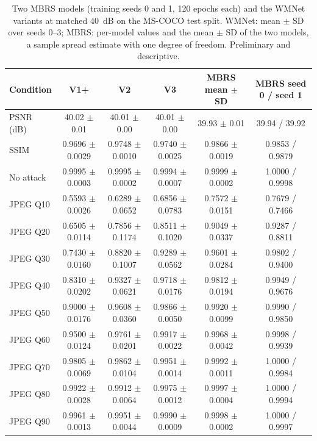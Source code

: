 \begin{table}[ht]
\centering
\caption{Two MBRS models (training seeds 0 and 1, 120 epochs each) and the WMNet variants at matched 40~dB on the MS-COCO test split. WMNet: mean $\pm$ SD over seeds 0--3; MBRS: per-model values and the mean $\pm$ SD of the two models, a sample spread estimate with one degree of freedom. Preliminary and descriptive.}
\label{tab:mbrs2}
\small
\begin{tabular}{lccccc}
\toprule
Condition & V1+ & V2 & V3 & MBRS mean $\pm$ SD & MBRS seed 0 / seed 1 \\
\midrule
PSNR (dB) & 40.02 $\pm$ 0.01 & 40.01 $\pm$ 0.00 & 40.01 $\pm$ 0.00 & 39.93 $\pm$ 0.01 & 39.94 / 39.92 \\
SSIM & 0.9696 $\pm$ 0.0029 & 0.9748 $\pm$ 0.0010 & 0.9740 $\pm$ 0.0025 & 0.9866 $\pm$ 0.0019 & 0.9853 / 0.9879 \\
No attack & 0.9995 $\pm$ 0.0003 & 0.9995 $\pm$ 0.0002 & 0.9994 $\pm$ 0.0007 & 0.9999 $\pm$ 0.0002 & 1.0000 / 0.9998 \\
JPEG Q10 & 0.5593 $\pm$ 0.0026 & 0.6289 $\pm$ 0.0652 & 0.6856 $\pm$ 0.0783 & 0.7572 $\pm$ 0.0151 & 0.7679 / 0.7466 \\
JPEG Q20 & 0.6505 $\pm$ 0.0114 & 0.7856 $\pm$ 0.1174 & 0.8511 $\pm$ 0.1020 & 0.9049 $\pm$ 0.0337 & 0.9287 / 0.8811 \\
JPEG Q30 & 0.7430 $\pm$ 0.0160 & 0.8820 $\pm$ 0.1007 & 0.9289 $\pm$ 0.0562 & 0.9601 $\pm$ 0.0284 & 0.9802 / 0.9400 \\
JPEG Q40 & 0.8310 $\pm$ 0.0202 & 0.9327 $\pm$ 0.0621 & 0.9718 $\pm$ 0.0176 & 0.9812 $\pm$ 0.0194 & 0.9949 / 0.9676 \\
JPEG Q50 & 0.9000 $\pm$ 0.0176 & 0.9608 $\pm$ 0.0360 & 0.9866 $\pm$ 0.0050 & 0.9920 $\pm$ 0.0099 & 0.9990 / 0.9850 \\
JPEG Q60 & 0.9500 $\pm$ 0.0124 & 0.9761 $\pm$ 0.0201 & 0.9917 $\pm$ 0.0022 & 0.9968 $\pm$ 0.0042 & 0.9998 / 0.9939 \\
JPEG Q70 & 0.9805 $\pm$ 0.0069 & 0.9862 $\pm$ 0.0104 & 0.9951 $\pm$ 0.0014 & 0.9992 $\pm$ 0.0011 & 1.0000 / 0.9984 \\
JPEG Q80 & 0.9922 $\pm$ 0.0028 & 0.9912 $\pm$ 0.0064 & 0.9975 $\pm$ 0.0012 & 0.9997 $\pm$ 0.0004 & 1.0000 / 0.9994 \\
JPEG Q90 & 0.9961 $\pm$ 0.0013 & 0.9951 $\pm$ 0.0044 & 0.9990 $\pm$ 0.0009 & 0.9998 $\pm$ 0.0002 & 1.0000 / 0.9997 \\

\end{tabular}
\end{table}
